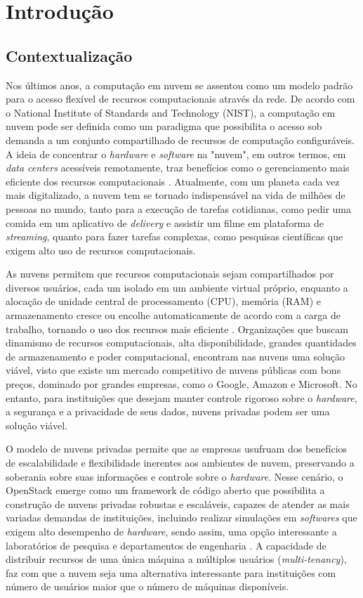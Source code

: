 \chapter{Introdução}

\section{Contextualização}

Nos últimos anos, a computação em nuvem se assentou como um modelo padrão para o acesso flexível de recursos computacionais através da rede. De acordo com o National Institute of Standards and Technology (NIST), a computação em nuvem pode ser definida como um paradigma que possibilita o acesso sob demanda a um conjunto compartilhado de recursos de computação configuráveis. A ideia de concentrar o \textit{hardware} e \textit{software} na "nuvem", em outros termos, em \textit{data centers} acessíveis remotamente, traz benefícios como o gerenciamento mais eficiente dos recursos computacionais \cite{mell2011}. Atualmente, com um planeta cada vez mais digitalizado, a nuvem tem se tornado indispensável na vida de milhões de pessoas no mundo, tanto para a execução de tarefas cotidianas, como pedir uma comida em um aplicativo de \textit{delivery} e assistir um filme em plataforma de \textit{streaming}, quanto para fazer tarefas complexas, como pesquisas científicas que exigem alto uso de recursos computacionais.

As nuvens permitem que recursos computacionais sejam compartilhados por diversos usuários, cada um isolado em um ambiente virtual próprio, enquanto a alocação de unidade central de processamento (CPU), memória (RAM) e armazenamento cresce ou encolhe automaticamente de acordo com a carga de trabalho, tornando o uso dos recursos mais eficiente \cite{dai2015, ray2013}. Organizações que buscam dinamismo de recursos computacionais, alta disponibilidade, grandes quantidades de armazenamento e poder computacional, encontram nas nuvens uma solução viável, visto que existe um mercado competitivo de nuvens públicas com bons preços, dominado por grandes empresas, como o Google, Amazon e Microsoft. No entanto, para instituições que desejam manter controle rigoroso sobre o \textit{hardware}, a segurança e a privacidade de seus dados, nuvens privadas podem ser uma solução viável.

O modelo de nuvens privadas permite que as empresas usufruam dos benefícios de escalabilidade e flexibilidade inerentes aos ambientes de nuvem, preservando a soberania sobre suas informações e controle sobre o \textit{hardware}. Nesse cenário, o OpenStack emerge como um framework de código aberto que possibilita a construção de nuvens privadas robustas e escaláveis, capazes de atender as mais variadas demandas de instituições, incluindo realizar simulações em \textit{softwares} que exigem alto desempenho de \textit{hardware}, sendo assim, uma opção interessante a laboratórios de pesquisa e departamentos de engenharia \cite{heuchert2021}. A capacidade de distribuir recursos de uma única máquina a múltiplos usuários (\textit{multi-tenancy}), faz com que a nuvem seja uma alternativa interessante para instituições com número de usuários maior que o número de máquinas disponíveis.

